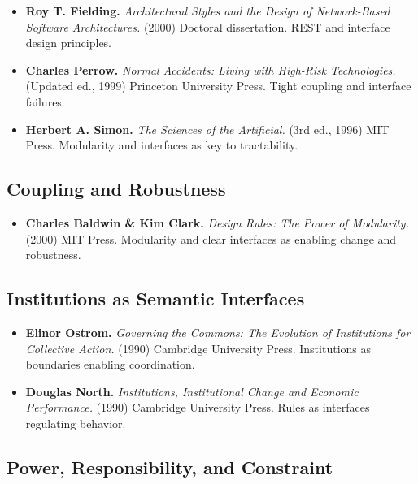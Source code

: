 \documentclass[
  openright]{book}
\providecommand{\tightlist}{%
  \setlength{\itemsep}{0pt}\setlength{\parskip}{0pt}}
\begin{document}
\begin{itemize}
\item
  \textbf{Roy T. Fielding.} \emph{Architectural Styles and the Design of
  Network-Based Software Architectures.} (2000) Doctoral dissertation.
  REST and interface design principles.
\item
  \textbf{Charles Perrow.} \emph{Normal Accidents: Living with High-Risk
  Technologies.} (Updated ed., 1999) Princeton University Press. Tight
  coupling and interface failures.
\item
  \textbf{Herbert A. Simon.} \emph{The Sciences of the Artificial.} (3rd
  ed., 1996) MIT Press. Modularity and interfaces as key to
  tractability.
\end{itemize}

\subsection{Coupling and Robustness}\label{coupling-and-robustness}

\begin{itemize}
\tightlist
\item
  \textbf{Charles Baldwin \& Kim Clark.} \emph{Design Rules: The Power
  of Modularity.} (2000) MIT Press. Modularity and clear interfaces as
  enabling change and robustness.
\end{itemize}

\subsection{Institutions as Semantic
Interfaces}\label{institutions-as-semantic-interfaces-1}

\begin{itemize}
\item
  \textbf{Elinor Ostrom.} \emph{Governing the Commons: The Evolution of
  Institutions for Collective Action.} (1990) Cambridge University
  Press. Institutions as boundaries enabling coordination.
\item
  \textbf{Douglas North.} \emph{Institutions, Institutional Change and
  Economic Performance.} (1990) Cambridge University Press. Rules as
  interfaces regulating behavior.
\end{itemize}

\subsection{Power, Responsibility, and
Constraint}\label{power-responsibility-and-constraint-1}
\end{document}
